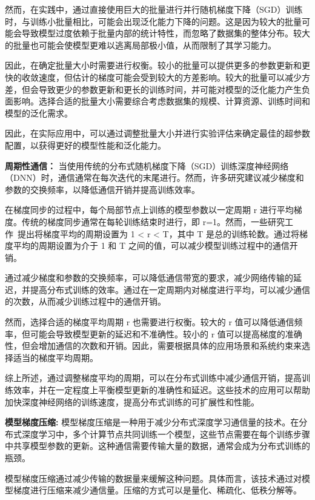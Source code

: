 然而，在实践中，通过直接使用巨大的批量进行并行随机梯度下降（SGD）训练时，与训练小批量相比，可能会出现泛化能力下降的问题。这是因为较大的批量可能会导致模型过度依赖于批量内部的统计特性，而忽略了数据集的整体分布。较大的批量也可能会使模型更难以逃离局部极小值，从而限制了其学习能力。

因此，在确定批量大小时需要进行权衡。较小的批量可以提供更多的参数更新和更快的收敛速度，但估计的梯度可能会受到较大的方差影响。较大的批量可以减少方差，但会导致更少的参数更新和更长的训练时间，并可能对模型的泛化能力产生负面影响。选择合适的批量大小需要综合考虑数据集的规模、计算资源、训练时间和模型的泛化需求。

因此，在实际应用中，可以通过调整批量大小并进行实验评估来确定最佳的超参数配置，以获得更好的模型性能和泛化能力。

\noindent \textbf{周期性通信：}
当使用传统的分布式随机梯度下降（SGD）训练深度神经网络（DNN）时，通信通常在每次迭代的末尾进行。然而，许多研究建议减少梯度和参数的交换频率，以降低通信开销并提高训练效率。

在梯度同步的过程中，每个局部节点上训练的模型参数以一定周期 r 进行平均梯度。传统的梯度同步通常在每轮训练结束时进行，即 r=1。然而，一些研究工作~提出将梯度平均的周期设置为 1 < r < T，其中 T 是总的训练轮数。通过将梯度平均的周期设置为介于 1 和 T 之间的值，可以减少模型训练过程中的通信开销。

通过减少梯度和参数的交换频率，可以降低通信带宽的要求，减少网络传输的延迟，并提高分布式训练的效率。通过在一定周期内对梯度进行平均，可以减少通信的次数，从而减少训练过程中的通信开销。

然而，选择合适的梯度平均周期 r 也需要进行权衡。较大的 r 值可以降低通信频率，但可能会导致模型更新的延迟和不准确性。较小的 r 值可以提高梯度的准确性，但会增加通信的次数和开销。因此，需要根据具体的应用场景和系统约束来选择适当的梯度平均周期。

综上所述，通过调整梯度平均的周期，可以在分布式训练中减少通信开销，提高训练效率，并在一定程度上平衡模型更新的准确性和延迟。这些技术的应用可以帮助加快深度神经网络的训练速度，提高分布式训练的可扩展性和性能。



\noindent \textbf{模型梯度压缩:}
% 
模型梯度压缩是一种用于减少分布式深度学习通信量的技术。在分布式深度学习中，多个计算节点共同训练一个模型，这些节点需要在每个训练步骤中共享模型参数的更新。这种通信需要传输大量的数据，通常会成为分布式训练的瓶颈。

模型梯度压缩通过减少传输的数据量来缓解这种问题。具体而言，该技术通过对模型梯度进行压缩来减少通信量。压缩的方式可以是量化、稀疏化、低秩分解等。

